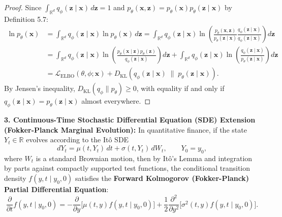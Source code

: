 \documentclass[11pt, letterpaper]{article}
\theoremstyle{definition}
\theoremstyle{remark}
\begin{document}
\begin{proof}
Since $\int_{\mathbb{R}^d} q_\phi(\mathbf{z} \mid \mathbf{x}) \, d\mathbf{z} = 1$ and $p_\theta(\mathbf{x}, \mathbf{z}) = p_\theta(\mathbf{x}) p_\theta(\mathbf{z} \mid \mathbf{x})$ by Definition 5.7:
\begin{align*}
    \ln p_\theta(\mathbf{x}) &= \int_{\mathbb{R}^d} q_\phi(\mathbf{z} \mid \mathbf{x}) \ln p_\theta(\mathbf{x}) \, d\mathbf{z} = \int_{\mathbb{R}^d} q_\phi(\mathbf{z} \mid \mathbf{x}) \ln \left( \frac{p_\theta(\mathbf{x}, \mathbf{z})}{p_\theta(\mathbf{z} \mid \mathbf{x})} \frac{q_\phi(\mathbf{z} \mid \mathbf{x})}{q_\phi(\mathbf{z} \mid \mathbf{x})} \right) d\mathbf{z} \\
    &= \int_{\mathbb{R}^d} q_\phi(\mathbf{z} \mid \mathbf{x}) \ln \left( \frac{p_\theta(\mathbf{x} \mid \mathbf{z}) p_\theta(\mathbf{z})}{q_\phi(\mathbf{z} \mid \mathbf{x})} \right) d\mathbf{z} + \int_{\mathbb{R}^d} q_\phi(\mathbf{z} \mid \mathbf{x}) \ln \left( \frac{q_\phi(\mathbf{z} \mid \mathbf{x})}{p_\theta(\mathbf{z} \mid \mathbf{x})} \right) d\mathbf{z} \\
    &= \mathcal{L}_{\text{ELBO}}(\theta, \phi; \mathbf{x}) + D_{\text{KL}}\left( q_\phi(\mathbf{z} \mid \mathbf{x}) \;\|\; p_\theta(\mathbf{z} \mid \mathbf{x}) \right).
\end{align*}
By Jensen's inequality, $D_{\text{KL}}(q_\phi \| p_\theta) \ge 0$, with equality if and only if $q_\phi(\mathbf{z} \mid \mathbf{x}) = p_\theta(\mathbf{z} \mid \mathbf{x})$ almost everywhere.
\end{proof}

\textbf{3. Continuous-Time Stochastic Differential Equation (SDE) Extension (Fokker-Planck Marginal Evolution):}
In quantitative finance, if the state $Y_t \in \mathbb{R}$ evolves according to the It\^o SDE
\[ dY_t = \mu(t, Y_t) \, dt + \sigma(t, Y_t) \, dW_t, \qquad Y_0 = y_0, \]
where $W_t$ is a standard Brownian motion, then by It\^o's Lemma and integration by parts against compactly supported test functions, the conditional transition density $f(y, t \mid y_0, 0)$ satisfies the \textbf{Forward Kolmogorov (Fokker-Planck) Partial Differential Equation}:
\[ \frac{\partial}{\partial t} f(y, t \mid y_0, 0) = -\frac{\partial}{\partial y}\Big[ \mu(t, y) f(y, t \mid y_0, 0) \Big] + \frac{1}{2} \frac{\partial^2}{\partial y^2}\Big[ \sigma^2(t, y) f(y, t \mid y_0, 0) \Big]. \]

\newpage
\end{document}

